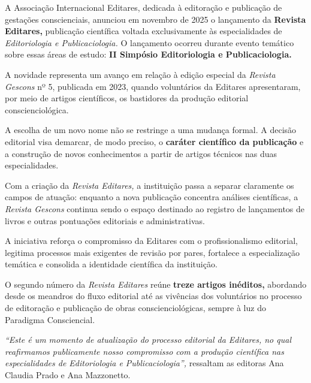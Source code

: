 \documentclass{gescons}
\begin{document}
    \begin{multicols}{2}


A Associação Internacional Editares, dedicada à editoração e publicação de gestações conscienciais, anunciou em novembro de 2025 o lançamento da \textbf{Revista Editares,} publicação científica voltada exclusivamente às especialidades de \emph{Editoriologia e Publicaciologia.} O lançamento ocorreu durante evento temático sobre essas áreas de estudo: \textbf{II Simpósio Editoriologia e Publicaciologia.}

A novidade representa um avanço em relação à edição especial da \emph{Revista Gescons} nº 5, publicada em 2023, quando voluntários da Editares apresentaram, por meio de artigos científicos, os bastidores da produção editorial conscienciológica.

A escolha de um novo nome não se restringe a uma mudança formal. A decisão editorial visa demarcar, de modo preciso, o \textbf{caráter científico da publicação} e a construção de novos conhecimentos a partir de artigos técnicos nas duas especialidades.

Com a criação da \emph{Revista Editares,} a instituição passa a separar claramente os campos de atuação: enquanto a nova publicação concentra análises científicas, a \emph{Revista Gescons} continua sendo o espaço destinado ao registro de lançamentos de livros e outras pontuações editoriais e administrativas.

A iniciativa reforça o compromisso da Editares com o profissionalismo editorial, legitima processos mais exigentes de revisão por pares, fortalece a especialização temática e consolida a identidade científica da instituição.

O segundo número da \emph{Revista Editares} reúne \textbf{treze artigos inéditos,} abordando desde os meandros do fluxo editorial até as vivências dos voluntários no processo de editoração e publicação de obras conscienciológicas, sempre à luz do Paradigma Consciencial.

\emph{``Este é um momento de atualização do processo editorial da Editares, no qual reafirmamos publicamente nosso compromisso com a produção científica nas especialidades de Editoriologia e Publicaciologia'',} ressaltam as editoras Ana Claudia Prado e Ana Mazzonetto.









    \end{multicols}
\end{document}
